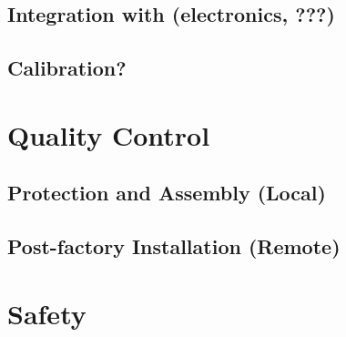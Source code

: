 \subsection{Integration with (electronics, ???)}
\label{sec:fddp-crp-install-pd-???}


\subsection{Calibration?}
\label{sec:fddp-crp-install-calib}



\section{Quality Control}
\label{sec:fddp-crp-qc}

\subsection{Protection and Assembly (Local)}
\label{sec:fddp-crp-qc-local}


\subsection{Post-factory Installation (Remote)}
\label{sec:fddp-crp-qc-remote}





\section{Safety}
\label{sec:fddp-crp-safety}






